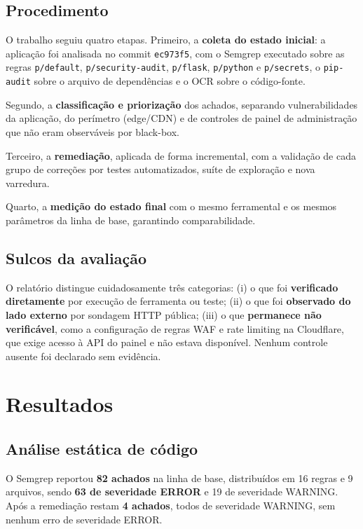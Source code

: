\documentclass[12pt,a4paper]{article}
\begin{document}
\subsection{Procedimento}

O trabalho seguiu quatro etapas. Primeiro, a \textbf{coleta do estado
inicial}: a aplicação foi analisada no commit \texttt{ec973f5}, com o Semgrep
executado sobre as regras \texttt{p/default}, \texttt{p/security-audit},
\texttt{p/flask}, \texttt{p/python} e \texttt{p/secrets}, o \texttt{pip-audit}
sobre o arquivo de dependências e o OCR sobre o código-fonte.

Segundo, a \textbf{classificação e priorização} dos achados, separando
vulnerabilidades da aplicação, do perímetro (edge/CDN) e de controles de
painel de administração que não eram observáveis por black-box.

Terceiro, a \textbf{remediação}, aplicada de forma incremental, com a
validação de cada grupo de correções por testes automatizados, suíte de
exploração e nova varredura.

Quarto, a \textbf{medição do estado final} com o mesmo ferramental e os
mesmos parâmetros da linha de base, garantindo comparabilidade.

\subsection{Sulcos da avaliação}

O relatório distingue cuidadosamente três categorias: (i) o que foi
\textbf{verificado diretamente} por execução de ferramenta ou teste;
(ii) o que foi \textbf{observado do lado externo} por sondagem HTTP pública;
(iii) o que \textbf{permanece não verificável}, como a configuração de
regras WAF e rate limiting na Cloudflare, que exige acesso à API do painel e
não estava disponível. Nenhum controle ausente foi declarado sem evidência.

\section{Resultados}\label{sec:resultados}

\subsection{Análise estática de código}\label{sec:estatica}

O Semgrep reportou \textbf{82 achados} na linha de base, distribuídos em 16
regras e 9 arquivos, sendo \textbf{63 de severidade \textsc{ERROR}} e 19 de
severidade \textsc{WARNING}. Após a remediação restam \textbf{4 achados}, todos
de severidade \textsc{WARNING}, sem nenhum erro de severidade
\textsc{ERROR}.
\end{document}
